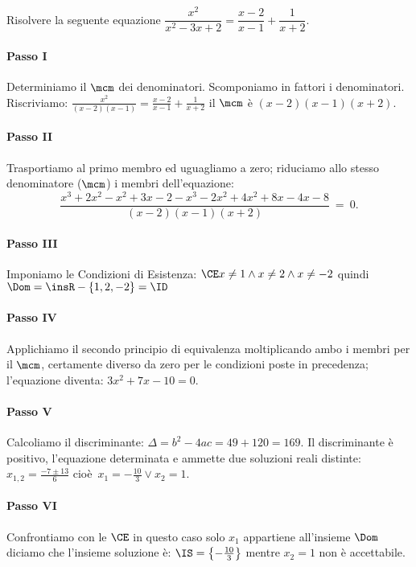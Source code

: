  \begin{esempio}
Risolvere la seguente equazione \(\dfrac{x^{2}}{x^{2} - 3 x + 2}=\dfrac{x - 2}{x 
- 1} +\dfrac{1}{x + 2}\).
 \paragraph{Passo I} Determiniamo il \(\mcm\) dei denominatori. Scomponiamo in 
fattori i denominatori. Riscriviamo: 
\(\frac{x^{2}}{( x - 2 ) ( x - 1 )}=\frac{x - 2}{x - 1} +\frac{1}{x + 2}\) 
il \(\mcm\) è \(( x - 2 ) ( x - 1 ) ( x + 2 )\).
 \paragraph{Passo II} Trasportiamo al primo membro ed uguagliamo a zero; 
riduciamo allo stesso denominatore (\(\mcm\)) i membri dell'equazione: 
\[\frac{x^3 + 2 x^2 - x^2 + 3 x - 2 - x^3 - 2 x^2 + 4x^2 + 8 x -4x - 8}
       {( x - 2 ) ( x - 1 ) ( x + 2 )}~=~0.\]
 \paragraph{Passo III} Imponiamo le Condizioni di Esistenza: 
 \(\CE x \neq 1 \wedge x \neq 2 \wedge x \neq - 2\) quindi 
 \(\Dom = \insR - \{ 1, 2, - 2 \}=\ID\)
 \paragraph{Passo IV} Applichiamo il secondo principio di equivalenza 
moltiplicando ambo i membri per il \(\mcm\), certamente diverso da zero per le 
condizioni poste in precedenza; l'equazione diventa: \(3 x^{2} + 7 x - 10 = 0\).
 \paragraph{Passo V} Calcoliamo il discriminante: \(\Delta=b^{2} - 4 a c=49 + 
120=169\). Il discriminante è positivo, l'equazione determinata e ammette due 
soluzioni reali distinte: \(x_{1,2}=\frac{- 7 \pm 13}{6}\) 
cioè~\(x_{1}=-\frac{10}{3} \vee x_{2}=1\).
 \paragraph{Passo VI} Confrontiamo con le \(\CE\) in questo caso solo \(x_{1}\) 
appartiene all'insieme \(\Dom\) diciamo che l'insieme soluzione è: 
\(\IS=\left\{-\frac{10}{3}\right\}\) mentre \(x_{2} = 1\) non è accettabile.
\end{esempio}

